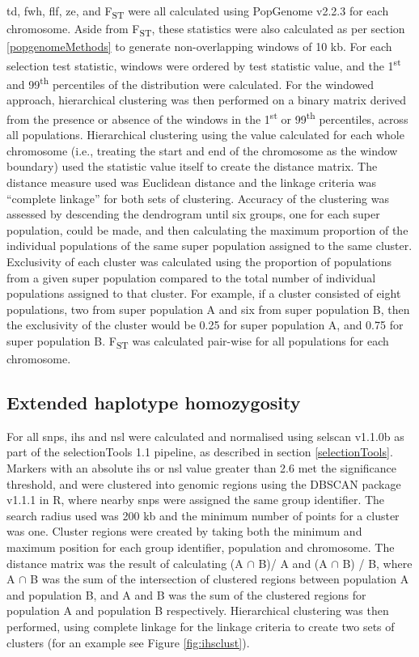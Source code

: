 \documentclass[]{report}
\begin{document}
\Gls{td}, \gls{fwh}, \gls{flf}, \gls{ze}, and F\textsubscript{ST} were
all calculated using PopGenome v2.2.3 \citep{Pfeifer2014} for each
chromosome. Aside from F\textsubscript{ST}, these statistics were also
calculated as per section \ref{popgenomeMethods} to generate
non-overlapping windows of 10 kb. For each selection test statistic,
windows were ordered by test statistic value, and the
1\textsuperscript{st} and 99\textsuperscript{th} percentiles of the
distribution were calculated. For the windowed approach, hierarchical
clustering was then performed on a binary matrix derived from the
presence or absence of the windows in the 1\textsuperscript{st} or
99\textsuperscript{th} percentiles, across all populations. Hierarchical
clustering using the value calculated for each whole chromosome (i.e.,
treating the start and end of the chromosome as the window boundary)
used the statistic value itself to create the distance matrix. The
distance measure used was Euclidean distance and the linkage criteria
was ``complete linkage'' for both sets of clustering. Accuracy of the
clustering was assessed by descending the dendrogram until six groups,
one for each super population, could be made, and then calculating the
maximum proportion of the individual populations of the same super
population assigned to the same cluster. Exclusivity of each cluster was
calculated using the proportion of populations from a given super
population compared to the total number of individual populations
assigned to that cluster. For example, if a cluster consisted of eight
populations, two from super population A and six from super population
B, then the exclusivity of the cluster would be 0.25 for super
population A, and 0.75 for super population B. F\textsubscript{ST} was
calculated pair-wise for all populations for each chromosome.

\subsection{Extended haplotype homozygosity}\label{haplocluster}

For all \glspl{snp}, \gls{ihs} and \gls{nsl} were calculated and
normalised using selscan v1.1.0b \citep{Szpiech2014} as part of the
selectionTools 1.1 \citep{Cadzow2014} pipeline, as described in section
\ref{selectionTools}. Markers with an absolute \gls{ihs} or \gls{nsl}
value greater than 2.6 met the significance threshold, and were
clustered into genomic regions using the DBSCAN package v1.1.1
\citep{dbscanref} in R, where nearby \glspl{snp} were assigned the same
group identifier. The search radius used was 200 kb and the minimum
number of points for a cluster was one. Cluster regions were created by
taking both the minimum and maximum position for each group identifier,
population and chromosome. The distance matrix was the result of
calculating (A \(\cap\) B)/ A and (A \(\cap\) B) / B, where A \(\cap\) B
was the sum of the intersection of clustered regions between population
A and population B, and A and B was the sum of the clustered regions for
population A and population B respectively. Hierarchical clustering was
then performed, using complete linkage for the linkage criteria to
create two sets of clusters (for an example see Figure
\ref{fig:ihsclust}).
\end{document}
